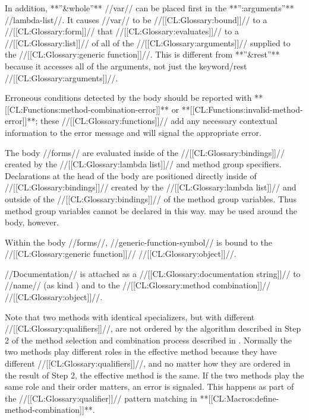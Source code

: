 In addition, **''&whole''** //var// can be placed first in the **'':arguments''** //lambda-list//. It causes //var// to be //[[CL:Glossary:bound]]// to a //[[CL:Glossary:form]]// that //[[CL:Glossary:evaluates]]// to a //[[CL:Glossary:list]]// of all of the //[[CL:Glossary:arguments]]// supplied to the //[[CL:Glossary:generic function]]//. This is different from **''&rest''** because it accesses all of the arguments, not just the keyword/rest //[[CL:Glossary:arguments]]//.

Erroneous conditions detected by the body should be reported with **[[CL:Functions:method-combination-error]]** or **[[CL:Functions:invalid-method-error]]**; these //[[CL:Glossary:functions]]// add any necessary contextual information to the error message and will signal the appropriate error.

The body //forms// are evaluated inside of the //[[CL:Glossary:bindings]]// created by the //[[CL:Glossary:lambda list]]// and method group specifiers.  Declarations at the head of the body are positioned directly inside of //[[CL:Glossary:bindings]]// created by the //[[CL:Glossary:lambda list]]// and outside of the //[[CL:Glossary:bindings]]// of the method group variables. Thus method group variables cannot be declared in this way.  may be used around the body, however.

Within the body //forms//, //generic-function-symbol// is bound to the //[[CL:Glossary:generic function]]// //[[CL:Glossary:object]]//.

//Documentation// is attached as a //[[CL:Glossary:documentation string]]// to //name// (as kind ) and to the //[[CL:Glossary:method combination]]// //[[CL:Glossary:object]]//.






Note that two methods with identical specializers, but with different //[[CL:Glossary:qualifiers]]//, are not ordered by the algorithm described in Step 2 of the method selection and combination process described in \secref\MethodSelectionAndCombination. Normally the two methods play different roles in the effective method because they have different //[[CL:Glossary:qualifiers]]//, and no matter how they are ordered in the result of Step 2, the effective method is the same. If the two methods play the same role and their order matters,  an error is signaled. This happens as part of the //[[CL:Glossary:qualifier]]// pattern matching in **[[CL:Macros:define-method-combination]]**.

